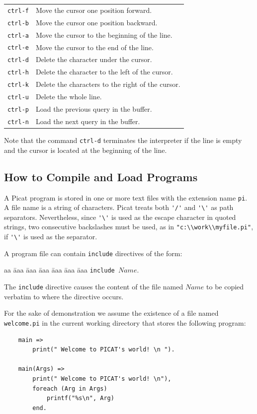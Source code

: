 \begin{tabular}{ll}
\verb+ctrl-f+ & Move the cursor one position forward. \\
\verb+ctrl-b+ & Move the cursor one position backward. \\
\verb+ctrl-a+ & Move the cursor to the beginning of the line. \\
\verb+ctrl-e+ & Move the cursor to the end of the line.  \\
\verb+ctrl-d+ & Delete the character under the cursor.  \\
\verb+ctrl-h+ & Delete the character to the left of the cursor.  \\
\verb+ctrl-k+ & Delete the characters to the right of the cursor. \\
\verb+ctrl-u+ & Delete the whole line.  \\
\verb+ctrl-p+ & Load the previous query in the buffer.  \\
\verb+ctrl-n+ & Load the next query in the buffer.
\end{tabular}

\noindent
Note that the command \verb+ctrl-d+ terminates the interpreter if the line is empty and the cursor is located at the beginning of the line.

\subsection{How to Compile and Load Programs}
A Picat program is stored in one or more text files with the extension name \texttt{pi}. A file name is a string of characters. Picat treats both  \verb+'/'+ and \verb+'\'+ as path separators. Nevertheless, since \verb+'\'+ is used as the escape character in quoted strings, two consecutive backslashes must be used, as in \verb+"c:\\work\\myfile.pi"+, if \verb+'\'+ is used as the separator.

A program file can contain \texttt{include} directives of the form:
\begin{tabbing}
aa \= aaa \= aaa \= aaa \= aaa \= aaa \= aaa \kill
\> \texttt{include $Name$}.
\end{tabbing}
The \texttt{include} directive causes the content of the file named $Name$ to be copied verbatim to where the directive occurs. 

For the sake of demonstration we assume the existence of a file named \texttt{welcome.pi} in the current working directory that stores the following program:
\begin{verbatim}
    main =>
        print(" Welcome to PICAT's world! \n ").

    main(Args) =>
        print(" Welcome to PICAT's world! \n"),
        foreach (Arg in Args)
            printf("%s\n", Arg)
        end.
\end{verbatim}


